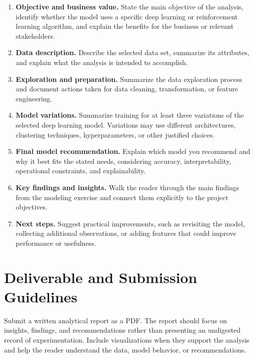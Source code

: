 \documentclass[11pt,letterpaper]{article}
\begin{document}
\begin{enumerate}
  \item \textbf{Objective and business value.} State the main objective of
    the analysis, identify whether the model uses a specific deep learning or
    reinforcement learning algorithm, and explain the benefits for the
    business or relevant stakeholders.

  \item \textbf{Data description.} Describe the selected data set, summarize
    its attributes, and explain what the analysis is intended to accomplish.

  \item \textbf{Exploration and preparation.} Summarize the data exploration
    process and document actions taken for data cleaning, transformation, or
    feature engineering.

  \item \textbf{Model variations.} Summarize training for at least three
    variations of the selected deep learning model. Variations may use
    different architectures, clustering techniques, hyperparameters, or other
    justified choices.

  \item \textbf{Final model recommendation.} Explain which model you
    recommend and why it best fits the stated needs, considering accuracy,
    interpretability, operational constraints, and explainability.

  \item \textbf{Key findings and insights.} Walk the reader through the main
    findings from the modeling exercise and connect them explicitly to the
    project objectives.

  \item \textbf{Next steps.} Suggest practical improvements, such as
    revisiting the model, collecting additional observations, or adding
    features that could improve performance or usefulness.
\end{enumerate}

\section{Deliverable and Submission Guidelines}

Submit a written analytical report as a PDF. The report should focus on
insights, findings, and recommendations rather than presenting an undigested
record of experimentation. Include visualizations when they support the
analysis and help the reader understand the data, model behavior, or
recommendations.
\end{document}
